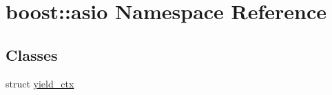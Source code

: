 \hypertarget{namespaceboost_1_1asio}{}\section{boost\+:\+:asio Namespace Reference}
\label{namespaceboost_1_1asio}
\subsection*{Classes}
\begin{DoxyCompactItemize}
\item 
struct \hyperlink{structboost_1_1asio_1_1yield__ctx}{yield\+\_\+ctx}
\end{DoxyCompactItemize}
